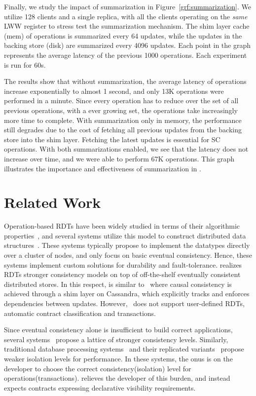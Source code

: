 Finally, we study the impact of summarization in
Figure~\ref{grf:summarization}. We utilize 128 clients and a single \quelea
replica, with all the clients operating on the \emph{same} LWW register to
stress test the summarization mechanism. The shim layer cache (mem) of
operations is summarized every 64 updates, while the updates in the backing
store (disk) are summarized every 4096 updates. Each point in the graph
represents the average latency of the previous 1000 operations. Each experiment
is run for 60s.

The results show that without summarization, the average latency of operations
increase exponentially to almost 1 second, and only 13K operations were
performed in a minute. Since every operation has to reduce over the set of all
previous operations, with a ever growing set, the operations take increasingly
more time to complete. With summarization only in memory, the performance still
degrades due to the cost of fetching all previous updates from the backing
store into the shim layer. Fetching the latest updates is essential for SC
operations. With both summarizations enabled, we see that the latency does not
increase over time, and we were able to perform 67K operations. This graph
illustrates the importance and effectiveness of summarization in \quelea.

\section{Related Work}
\label{q_sec:related}

Operation-based RDTs have been widely studied in terms of their algorithmic
properties~\cite{SSS,Burckhardt2014}, and several systems utilize this model to
construct distributed data structures~\cite{Lakshman2010,Bayou,Tango}. These
systems typically propose to implement the datatypes directly over a cluster of
nodes, and only focus on basic eventual consistency. Hence, these systems
implement custom solutions for durability and fault-tolerance. \quelea realizes
RDTs stronger consistency models on top of off-the-shelf eventually consistent
distributed stores. In this respect, \quelea is similar to~\cite{BoltOn} where
causal consistency is achieved through a shim layer on Cassandra, which
explicitly tracks and enforces dependencies between updates.
However,~\cite{BoltOn} does not support user-defined RDTs, automatic contract
classification and transactions.

Since eventual consistency alone is insufficient to build correct applications,
several systems~\cite{Bayou,Terry2013,RedBlue} propose a lattice of stronger
consistency levels. Similarly, traditional database processing
systems~\cite{Berenson95} and their replicated variants~\cite{BailisHAT}
propose weaker isolation levels for performance. In these systems, the onus is
on the developer to choose the correct consistency(isolation) level for
operations(transactions). \quelea relieves the developer of this burden, and
instead expects contracts expressing declarative visibility requirements.

